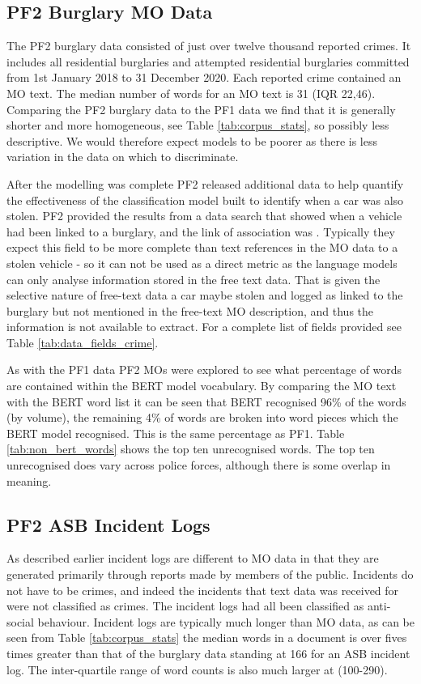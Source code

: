 \subsection{PF2 Burglary MO Data} The PF2 burglary data consisted of just over twelve thousand reported crimes. It includes all residential burglaries and attempted residential burglaries committed from 1st January 2018 to 31 December 2020. Each reported crime contained an MO text. The median number of words for an MO text is 31 (IQR 22,46). Comparing the PF2 burglary data to the PF1 data we find that it is generally shorter and more homogeneous, see Table \ref{tab:corpus_stats}, so possibly less descriptive. We would therefore expect models to be poorer as there is less variation in the data on which to discriminate. 

After the modelling was complete PF2 released additional data to help quantify the effectiveness of the classification model built to identify when a car was also stolen. PF2 provided the results from a data search that showed when a vehicle had been linked to a burglary, and the link of association was . Typically they expect this field to be more complete than text references in the MO data to a stolen vehicle - so it can not be used as a direct metric as the language models can only analyse information stored in the free text data. That is given the selective nature of free-text data a car maybe stolen and logged as linked to the burglary but not mentioned in the free-text MO description, and thus the information is not available to extract. For a complete list of fields provided see Table \ref{tab:data_fields_crime}.

As with the PF1 data PF2 MOs were explored to see what percentage of words are contained within the BERT model vocabulary. By comparing the MO text with the BERT word list it can be seen that BERT recognised 96\% of the words (by volume), the remaining 4\% of words are broken into word pieces which the BERT model recognised. This is the same percentage as PF1.  Table \ref{tab:non_bert_words} shows the top ten unrecognised words. The top ten unrecognised does vary across police forces, although there is some overlap in meaning. 


\subsection{PF2 ASB Incident Logs}As described earlier incident logs are different to MO data in that they are generated primarily through reports made by members of the public. Incidents do not have to be crimes, and indeed the incidents that text data was received for were not classified as crimes. The incident logs had all been classified as anti-social behaviour. Incident logs are typically much longer than MO data, as can be seen from Table \ref{tab:corpus_stats} the median words in a document is over fives times greater than that of the burglary data standing at 166 for an ASB incident log. The inter-quartile range of word counts is also much larger at (100-290).  

